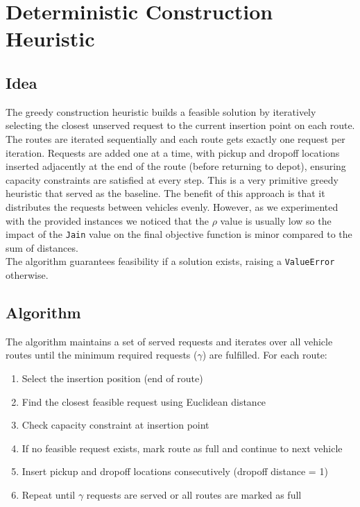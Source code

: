\documentclass[a4paper]{scrartcl}
\begin{document}
\section{Deterministic Construction Heuristic}
\subsection{Idea} The greedy construction heuristic builds a feasible solution by iteratively selecting the closest unserved request to the current insertion point on each route. The routes are iterated sequentially and each route gets exactly one request per iteration. Requests are added one at a time, with pickup and dropoff locations inserted adjacently at the end of the route (before returning to depot), ensuring capacity constraints are satisfied at every step. This is a very primitive greedy heuristic that served as the baseline. The benefit of this approach is that it distributes the requests between vehicles evenly. However, as we experimented with the provided instances we noticed that the $\rho$ value is usually low so the impact of the \texttt{Jain} value on the final objective function is minor compared to the sum of distances. \\
The algorithm guarantees feasibility if a solution exists, raising a \texttt{ValueError} otherwise.

\subsection{Algorithm}
The algorithm maintains a set of served requests and iterates over all vehicle routes until the minimum required requests ($\gamma$) are fulfilled. For each route:
\begin{enumerate}
  \item Select the insertion position (end of route)
  \item Find the closest feasible request using Euclidean distance
  \item Check capacity constraint at insertion point
  \item If no feasible request exists, mark route as full and continue to next vehicle
  \item Insert pickup and dropoff locations consecutively (dropoff distance = 1)
  \item Repeat until $\gamma$ requests are served or all routes are marked as full
\end{enumerate}
\end{document}
